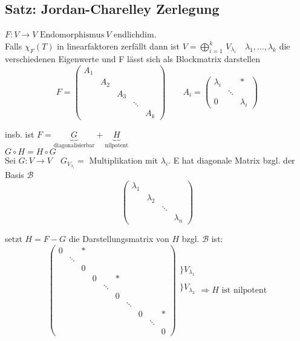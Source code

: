 \documentclass[titlepage,12pt,a4paper,ngerman]{report}
\newcommand{\tx}[1]{\textrm{#1}}
\newcommand{\ub}[1]{\underbrace{#1}}
\newcommand{\enph}{F: V \to V \textrm{ Endomorphismus}}
\begin{document}
\subsection{Satz: Jordan-Charelley Zerlegung}
$\enph \ V$ endlichdim.\\
Falls $ \chi_F(T) $ in linearfaktoren zerfällt dann ist $ V = \bigoplus\limits_{i=1}^{k} \,V_{\lambda_i} \quad \lambda_1,\dots, \lambda_k$ die verschiedenen Eigenwerte und F lässt sich als Blockmatrix darstellen
$$ F = \begin{pmatrix}
A_1 \\
& A_2 \\
& & A_3 \\
& & & \ddots \\
& & & & A_k
\end{pmatrix} \qquad A_i = \begin{pmatrix}
\lambda_i & & *\\
& \ddots \\
0 & & \lambda_i
\end{pmatrix}$$

insb. ist $ F = \ub{G}_{\tx{diagonalisierbar}}+\ub{H}_{\tx{nilpotent}} $\\
$G \circ H = H \circ G $\\
Sei $ G: V\to V \quad G _{V_{\lambda_i}} =$ Multiplikation mit $ \lambda_i $. E hat diagonale Matrix bzgl. der Basis $ \mathcal{B} $ 
$$\begin{pmatrix}
\lambda_1 \\
& \lambda_2\\
& & \ddots \\
& & & \lambda_n
\end{pmatrix}$$

setzt $ H = F - G $ die Darstellungsmatrix von $ H $ bzgl. $ \mathcal{B} $ ist:
$$\begin{pmatrix}
0 & & *\\
& \ddots \\
& & 0\\
& & & 0 & & *\\
& & & & \ddots\\
& & & & & 0\\
& & & & & & \ddots\\
& & & & & & & 0 & & *\\
& & & & & & & & \ddots\\
& & & & & & & & &0
\end{pmatrix} \begin{matrix}
\\
\bigg\} V_{\lambda_1}\\
\\
\bigg\} V_{\lambda_2}\\
\\
\\
\\
\\
\\
\\
\end{matrix} \Rightarrow H \tx{ ist nilpotent}$$
\end{document}
